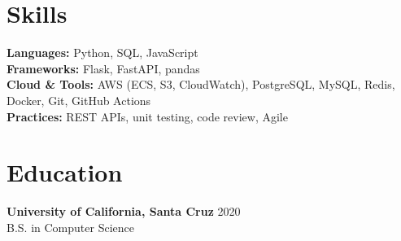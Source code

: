 \documentclass[letterpaper,11pt]{article}
\begin{document}
\section*{Skills}
\textbf{Languages:} Python, SQL, JavaScript\\
\textbf{Frameworks:} Flask, FastAPI, pandas\\
\textbf{Cloud \& Tools:} AWS (ECS, S3, CloudWatch), PostgreSQL, MySQL, Redis, Docker, Git, GitHub Actions\\
\textbf{Practices:} REST APIs, unit testing, code review, Agile

\section*{Education}
\textbf{University of California, Santa Cruz} \hfill 2020\\
B.S. in Computer Science
\end{document}
